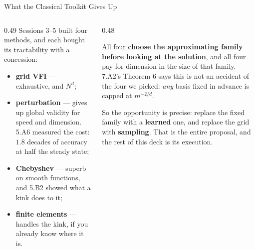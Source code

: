 \begin{frame}{What the Classical Toolkit Gives Up}
\begin{columns}[T]
\begin{column}{0.49\textwidth}
\small
Sessions 3--5 built four methods, and each bought its tractability with a concession:
\medskip
\begin{itemize}\small\setlength{\itemsep}{1.1mm}
  \item \textbf{grid VFI} --- exhaustive, and $N^{d}$;
  \item \textbf{perturbation} --- gives up global validity for speed and dimension. 5.A6 measured the cost: $1.8$ decades of accuracy at half the steady state;
  \item \textbf{Chebyshev} --- superb on smooth functions, and 5.B2 showed what a kink does to it;
  \item \textbf{finite elements} --- handles the kink, if you already know where it is.
\end{itemize}
\end{column}
\begin{column}{0.48\textwidth}
\begin{takeawaybox}[title=\textbf{The common structure}]\small
All four \textbf{choose the approximating family before looking at the solution}, and all four pay for dimension in the size of that family.
\medskip
7.A2's Theorem 6 says this is not an accident of the four we picked: \emph{any} basis fixed in advance is capped at $m^{-2/d}$.
\end{takeawaybox}
\medskip
\begin{examplebox}\footnotesize
So the opportunity is precise: replace the fixed family with a \textbf{learned} one, and replace the grid with \textbf{sampling}. That is the entire proposal, and the rest of this deck is its execution.
\end{examplebox}
\end{column}
\end{columns}
\end{frame}

